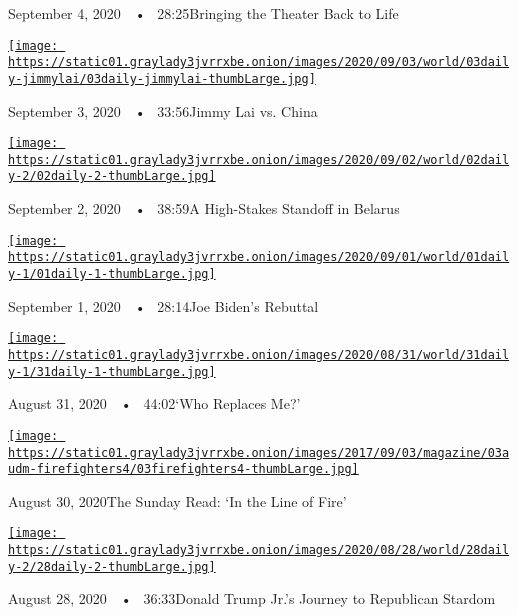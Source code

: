 September 4, 2020~~•~ 28:25Bringing the Theater Back to Life

\href{https://www.nytimes3xbfgragh.onion/2020/09/03/podcasts/the-daily/hong-kong-china-jimmy-lai.html?action=click\&module=audio-series-bar\&region=header\&pgtype=Article}{\texttt{[image: https://static01.graylady3jvrrxbe.onion/images/2020/09/03/world/03daily-jimmylai/03daily-jimmylai-thumbLarge.jpg]}}

September 3, 2020~~•~ 33:56Jimmy Lai vs. China

\href{https://www.nytimes3xbfgragh.onion/2020/09/02/podcasts/the-daily/belarus-protests-lukashenko.html?action=click\&module=audio-series-bar\&region=header\&pgtype=Article}{\texttt{[image: https://static01.graylady3jvrrxbe.onion/images/2020/09/02/world/02daily-2/02daily-2-thumbLarge.jpg]}}

September 2, 2020~~•~ 38:59A High-Stakes Standoff in Belarus

\href{https://www.nytimes3xbfgragh.onion/2020/09/01/podcasts/the-daily/joe-biden-protests-trump.html?action=click\&module=audio-series-bar\&region=header\&pgtype=Article}{\texttt{[image: https://static01.graylady3jvrrxbe.onion/images/2020/09/01/world/01daily-1/01daily-1-thumbLarge.jpg]}}

September 1, 2020~~•~ 28:14Joe Biden's Rebuttal

\href{https://www.nytimes3xbfgragh.onion/2020/08/31/podcasts/the-daily/flint-michigan-police-officer.html?action=click\&module=audio-series-bar\&region=header\&pgtype=Article}{\texttt{[image: https://static01.graylady3jvrrxbe.onion/images/2020/08/31/world/31daily-1/31daily-1-thumbLarge.jpg]}}

August 31, 2020~~•~ 44:02`Who Replaces Me?'

\href{https://www.nytimes3xbfgragh.onion/2020/08/30/podcasts/the-daily/california-wildfires-prisoners.html?action=click\&module=audio-series-bar\&region=header\&pgtype=Article}{\texttt{[image: https://static01.graylady3jvrrxbe.onion/images/2017/09/03/magazine/03audm-firefighters4/03firefighters4-thumbLarge.jpg]}}

August 30, 2020The Sunday Read: `In the Line of Fire'

\href{https://www.nytimes3xbfgragh.onion/2020/08/28/podcasts/the-daily/donald-trump-junior-campaign.html?action=click\&module=audio-series-bar\&region=header\&pgtype=Article}{\texttt{[image: https://static01.graylady3jvrrxbe.onion/images/2020/08/28/world/28daily-2/28daily-2-thumbLarge.jpg]}}

August 28, 2020~~•~ 36:33Donald Trump Jr.'s Journey to Republican
Stardom

